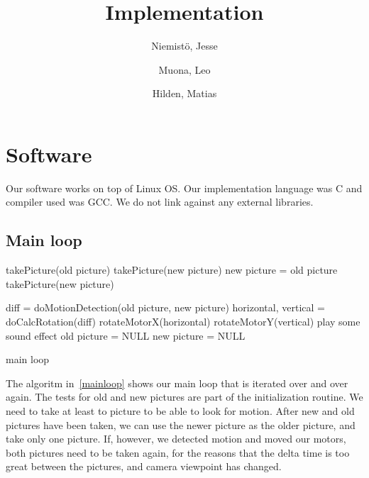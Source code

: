 \documentclass[english,11pt,twoside,a4paper]{article}
\begin{document}
\author{
  Niemistö, Jesse
  \and
  Muona, Leo
  \and
  Hilden, Matias
}
\title{Implementation}

\maketitle

\section{Software}

Our software works on top of Linux OS. Our implementation language was C and compiler used was GCC. We do not link against any external libraries. 

\subsection{Main loop}

\begin{algorithm}
  \label{mainloop}
  \begin{algorithmic}
      \STATE takePicture(old picture)
      \STATE takePicture(new picture)
    \ELSE
      \STATE new picture = old picture
      \STATE takePicture(new picture)
    \ENDIF

      \STATE diff = doMotionDetection(old picture, new picture)
        \STATE horizontal, vertical = doCalcRotation(diff)
        \STATE rotateMotorX(horizontal)
        \STATE rotateMotorY(vertical)
          \STATE play some sound effect
        \ENDIF
	\STATE old picture = NULL
	\STATE new picture = NULL
      \ENDIF
    \ENDIF
  \end{algorithmic}
  \caption{main loop}
\end{algorithm}

The algoritm in~\ref{mainloop} shows our main loop that is iterated over and over again. The tests for old and new pictures are part of the initialization routine. We need to take at least to picture to be able to look for motion. After new and old pictures have been taken, we can use the newer picture as the older picture, and take only one picture. If, however, we detected motion and moved our motors, both pictures need to be taken again, for the reasons that the delta time is too great between the pictures, and camera viewpoint has changed.
\end{document}
